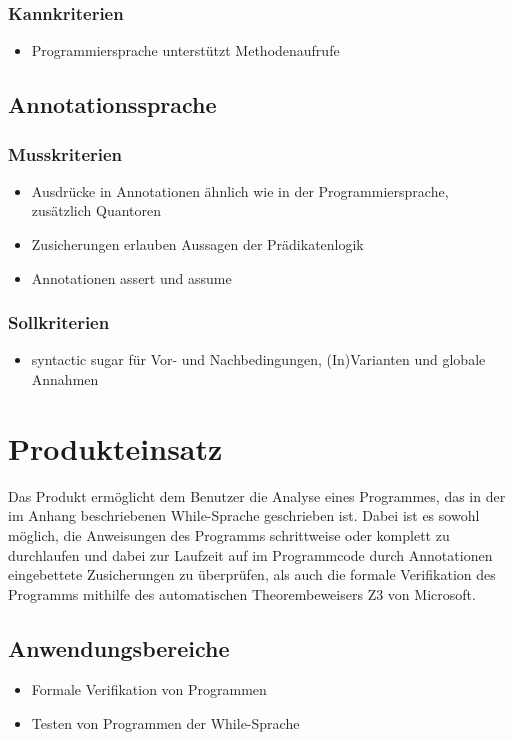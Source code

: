 \documentclass[a4paper,10pt]{article}
\begin{document}
\subsubsection{Kannkriterien}
\begin{itemize}
  \item Programmiersprache unterstützt Methodenaufrufe
\end{itemize}

\subsection{Annotationssprache}
\subsubsection{Musskriterien}
\begin{itemize}
  \item Ausdrücke in Annotationen ähnlich wie in der Programmiersprache, zusätzlich Quantoren
  \item Zusicherungen erlauben Aussagen der Prädikatenlogik
  \item Annotationen assert und assume
\end{itemize}
\subsubsection{Sollkriterien}
\begin{itemize}
  \item syntactic sugar für Vor- und Nachbedingungen, (In)Varianten und globale Annahmen
\end{itemize}


\section{Produkteinsatz}
Das Produkt ermöglicht dem Benutzer die Analyse eines Programmes, das in der im Anhang beschriebenen While-Sprache geschrieben ist. Dabei ist es sowohl möglich, die Anweisungen des Programms schrittweise oder komplett zu durchlaufen und dabei zur Laufzeit auf im Programmcode durch Annotationen eingebettete Zusicherungen zu überprüfen, als auch die formale Verifikation des Programms mithilfe des automatischen Theorembeweisers Z3 von Microsoft. 

\subsection{Anwendungsbereiche}
\begin{itemize}
  \item Formale Verifikation von Programmen
  \item Testen von Programmen der While-Sprache
\end{itemize}
\end{document}
